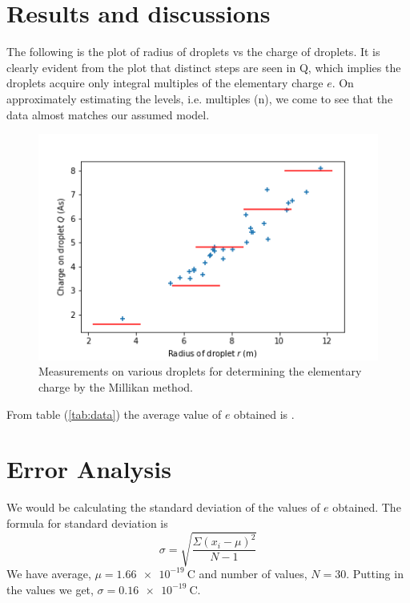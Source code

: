 \documentclass[%
 reprint,
 amsmath,amssymb,
 aps,
]{revtex4-2}
\begin{document}
\section{Results and discussions}
    The following is the plot of radius of droplets vs the charge of droplets.  It  is  clearly  evident  from  the  plot  that distinct steps are seen in Q, which implies the droplets acquire only integral multiples of the elementary charge $e$.  On approximately estimating the levels, i.e.  multiples (n),  we  come  to  see that  the  data  almost  matches  our assumed model.
    \begin{figure}[h!]
        \centering
        \includegraphics[scale = 0.55]{Figures/plot.png}
        \caption{Measurements on various droplets for determining the elementary charge by the Millikan method.}
        \label{fig:plot}
    \end{figure}
    From table (\ref{tab:data}) the average value of $e$ obtained is .


\section{Error Analysis}
We would be calculating the standard deviation of the values of $e$ obtained.
The formula for standard deviation is
\begin{equation}
    \sigma = \sqrt{\dfrac{\Sigma (x_i - \mu)^2}{N - 1}}
\end{equation}
We have average, $\mu = \SI{1.66e-19}{\coulomb}$ and number of values, $N = 30$. Putting in the values we get, 
$\sigma = \SI{0.16e-19}{\coulomb}$.
\end{document}
